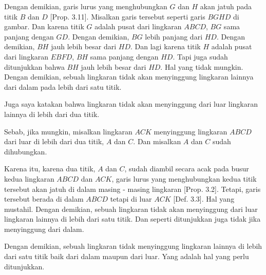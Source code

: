 \documentclass[a4paper]{book}
\begin{document}
Dengan demikian, garis lurus yang menghubungkan $G$ dan $H$ akan jatuh 
pada titik $B$ dan $D$ [Prop. 3.11]. Misalkan garis tersebut seperti
garis $BGHD$ di gambar. Dan karena titik $G$ adalah pusat dari lingkaran
$ABCD$, $BG$ sama panjang dengan $GD$. Dengan demikian, $BG$ lebih
panjang dari $HD$. Dengan demikian, $BH$ jauh lebih besar dari $HD$.
Dan lagi karena titik $H$ adalah pusat dari lingkaran $EBFD$, $BH$
sama panjang dengan $HD$. Tapi juga sudah ditunjukkan bahwa $BH$ jauh
lebih besar dari $HD$. Hal yang tidak mungkin. Dengan demikian, 
sebuah lingkaran tidak akan menyinggung lingkaran lainnya dari dalam
pada lebih dari satu titik.

Juga saya katakan bahwa lingkaran tidak akan menyinggung dari luar 
lingkaran lainnya di lebih dari dua titik.

Sebab, jika mungkin, misalkan lingkaran $ACK$ menyinggung lingkaran
$ABCD$ dari luar di lebih dari dua titik, $A$ dan $C$. Dan misalkan
$A$ dan $C$ sudah dihubungkan.

Karena itu, karena dua titik, $A$ dan $C$, sudah diambil secara acak
pada busur kedua lingkaran $ABCD$ dan $ACK$, garis lurus yang 
menghubungkan kedua titik tersebut akan jatuh di dalam masing - masing
lingkaran [Prop. 3.2]. Tetapi, garis tersebut berada di dalam $ABCD$ 
tetapi di luar $ACK$ [Def. 3.3]. Hal yang mustahil. Dengan demikian,
sebuah lingkaran tidak akan menyinggung dari luar lingkaran lainnya 
di lebih dari satu titik. Dan seperti ditunjukkan juga tidak jika
menyinggung dari dalam.

Dengan demikian, sebuah lingkaran tidak menyinggung lingkaran lainnya
di lebih dari satu titik baik dari dalam maupun dari luar. Yang adalah
hal yang perlu ditunjukkan.

\end{document}
